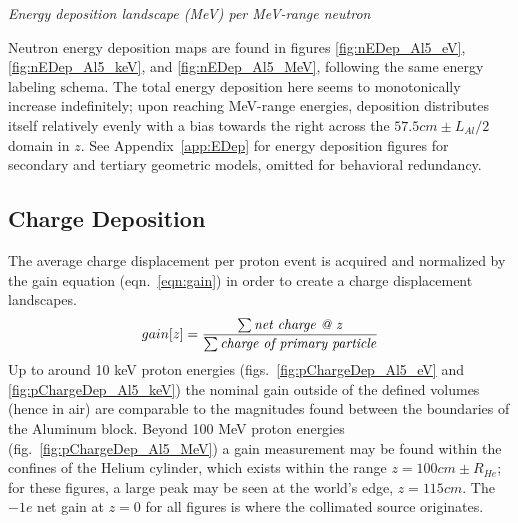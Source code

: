 \documentclass[11pt]{article}
\makeatletter
\newenvironment{figurehere}
{\def\@captype{figure}}{}
\makeatother
\begin{document}
\begin{multicols}{2}
\vspace{0.15 cm}
\begin{figurehere}
\centering
{}
\caption{\small \emph{Energy deposition landscape (MeV) per MeV-range neutron}}
\label{fig:nEDep_Al5_MeV}
\end{figurehere}
\vspace{0.2 cm}

Neutron energy deposition maps are found in figures \ref{fig:nEDep_Al5_eV}, \ref{fig:nEDep_Al5_keV}, and \ref{fig:nEDep_Al5_MeV}, following the same energy labeling schema.  The total energy deposition here seems to monotonically increase indefinitely; upon reaching MeV-range energies, deposition distributes itself relatively evenly with a bias towards the right across the $57.5 cm \pm L_{Al}/2$ domain in $z$.  See Appendix~\ref{app:EDep} for energy deposition figures for secondary and tertiary geometric models, omitted for behavioral redundancy.


\subsection{Charge Deposition}

The average charge displacement per proton event is acquired and normalized by the gain equation (eqn.~\ref{eqn:gain}) in order to create a charge displacement landscapes.
\begin{equation}
  gain[z] = \frac{\sum \text{\emph{net charge @ z}} }{\sum \text{\emph{charge of primary particle}} } \label{eqn:gain}
\end{equation}
Up to around 10 keV proton energies (figs.~\ref{fig:pChargeDep_Al5_eV} and \ref{fig:pChargeDep_Al5_keV}) the nominal gain outside of the defined volumes (hence in air) are comparable to the magnitudes found between the boundaries of the Aluminum block.  Beyond 100 MeV proton energies (fig.~\ref{fig:pChargeDep_Al5_MeV}) a gain measurement may be found within the confines of the Helium cylinder, which exists within the range $z=100 cm \pm R_{He}$; for these figures, a large peak may be seen at the world's edge, $z=115 cm$.  The $-1e$ net gain at $z=0$ for all figures is where the collimated source originates.


\end{multicols}
\end{document}
